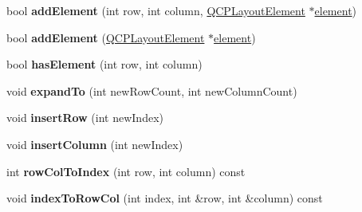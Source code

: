 \begin{DoxyCompactItemize}
\item 
bool {\bfseries add\+Element} (int row, int column, \hyperlink{class_q_c_p_layout_element}{Q\+C\+P\+Layout\+Element} $\ast$\hyperlink{class_q_c_p_layout_grid_a525f25e6ba43ee228151d074251b4e6a}{element})\hypertarget{class_q_c_p_layout_grid_adff1a2ca691ed83d2d24a4cd1fe17012}{}\label{class_q_c_p_layout_grid_adff1a2ca691ed83d2d24a4cd1fe17012}

\item 
bool {\bfseries add\+Element} (\hyperlink{class_q_c_p_layout_element}{Q\+C\+P\+Layout\+Element} $\ast$\hyperlink{class_q_c_p_layout_grid_a525f25e6ba43ee228151d074251b4e6a}{element})\hypertarget{class_q_c_p_layout_grid_a4c44025dd25acd27e053cadfd448ad7b}{}\label{class_q_c_p_layout_grid_a4c44025dd25acd27e053cadfd448ad7b}

\item 
bool {\bfseries has\+Element} (int row, int column)\hypertarget{class_q_c_p_layout_grid_ab0cf4f7edc9414a3bfaddac0f46dc0a0}{}\label{class_q_c_p_layout_grid_ab0cf4f7edc9414a3bfaddac0f46dc0a0}

\item 
void {\bfseries expand\+To} (int new\+Row\+Count, int new\+Column\+Count)\hypertarget{class_q_c_p_layout_grid_a886c0dcbabd51a45da399e044552b685}{}\label{class_q_c_p_layout_grid_a886c0dcbabd51a45da399e044552b685}

\item 
void {\bfseries insert\+Row} (int new\+Index)\hypertarget{class_q_c_p_layout_grid_a48af3dd7c3a653d9c3d7dd99bd02e838}{}\label{class_q_c_p_layout_grid_a48af3dd7c3a653d9c3d7dd99bd02e838}

\item 
void {\bfseries insert\+Column} (int new\+Index)\hypertarget{class_q_c_p_layout_grid_a1e880a321dbe8b43b471ccd764433dc4}{}\label{class_q_c_p_layout_grid_a1e880a321dbe8b43b471ccd764433dc4}

\item 
int {\bfseries row\+Col\+To\+Index} (int row, int column) const \hypertarget{class_q_c_p_layout_grid_a3cefc5fe391722b653958ab6e984c706}{}\label{class_q_c_p_layout_grid_a3cefc5fe391722b653958ab6e984c706}

\item 
void {\bfseries index\+To\+Row\+Col} (int index, int \&row, int \&column) const \hypertarget{class_q_c_p_layout_grid_a964d4e6284af1cfc4da0292c2e0b5ac0}{}\label{class_q_c_p_layout_grid_a964d4e6284af1cfc4da0292c2e0b5ac0}

\end{DoxyCompactItemize}
